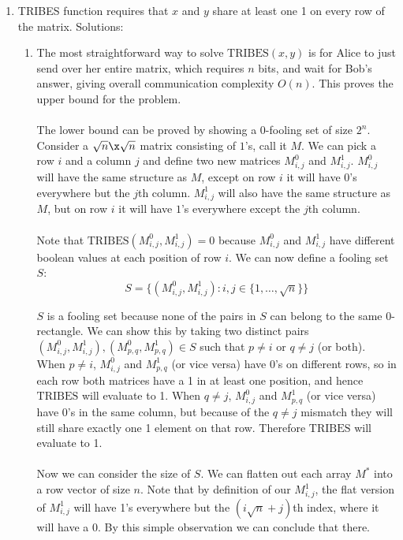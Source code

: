 \documentclass{article}
\begin{document}
\begin{enumerate}
    \item TRIBES function requires that $x$ and $y$ share at least one 1 on
        every row of the matrix. Solutions:
        \begin{enumerate}[label=(\alph*)]
            \item The most straightforward way to solve $\textrm{TRIBES}(x, y)$
                is for Alice to just send over her entire matrix, which
                requires $n$ bits, and wait for Bob's answer, giving overall
                communication complexity $O(n)$. This proves the upper bound
                for the problem.
                \\\\ 
                The lower bound can be proved by showing a 0-fooling set of
                size $2^n$. Consider a $\sqrt{n} \x \sqrt{n}$ matrix consisting
                of $1$'s, call it $M$. We can pick a row $i$ and a column $j$
                and define two new matrices $M^0_{i,j}$ and $M^1_{i,j}$.
                $M^0_{i,j}$ will have the same structure as $M$, except on row
                $i$ it will have $0$'s everywhere but the $j$th column.
                $M^1_{i,j}$ will also have the same structure as $M$, but on
                row $i$ it will have $1$'s everywhere except the $j$th column.
                \\\\
                Note that $\textrm{TRIBES}(M^0_{i,j}, M^1_{i,j}) = 0$ because
                $M^0_{i,j}$ and $M^1_{i,j}$ have different boolean values at
                each position of row $i$. We can now define a fooling set $S$:
                $$ S = \{ (M^0_{i,j}, M^1_{i,j}): i, j \in \{ 1, \ldots,
                \sqrt{n} \}\} $$

                $S$ is a fooling set because none of the pairs in $S$ can
                belong to the same 0-rectangle. We can show this by taking two
                distinct pairs $(M^0_{i,j}, M^1_{i,j}), (M^0_{p,q}, M^1_{p,q})
                \in S$ such that $p \neq i$ or $q \neq j$ (or both). When $p
                \neq i$, $M^0_{i,j}$ and $M^1_{p,q}$ (or vice versa) have 0's
                on different rows, so in each row both matrices have a 1 in at
                least one position, and hence $\textrm{TRIBES}$ will evaluate
                to 1. When $q \neq j$, $M^0_{i,j}$ and $M^1_{p,q}$ (or vice
                versa) have 0's in the same column, but because of the $q \neq
                j$ mismatch they will still share exactly one 1 element on that
                row. Therefore $\textrm{TRIBES}$ will evaluate to 1.
                \\\\
                Now we can consider the size of $S$. We can flatten out each
                array $M^*$ into a row vector of size $n$. Note that by
                definition of our $M^1_{i,j}$, the flat version of $M^1_{i,j}$
                will have 1's everywhere but the $(i \sqrt{n} + j)$th index,
                where it will have a 0. By this simple observation we can
                conclude that there.
                \\


\end{enumerate}
\end{enumerate}
\end{document}

